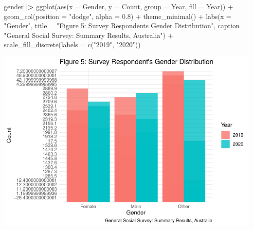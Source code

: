 \documentclass[
]{article}
\newenvironment{Shaded}{\begin{snugshade}}{\end{snugshade}}
\newcommand{\AttributeTok}[1]{\textcolor[rgb]{0.77,0.63,0.00}{#1}}
\newcommand{\ErrorTok}[1]{\textcolor[rgb]{0.64,0.00,0.00}{\textbf{#1}}}
\newcommand{\FloatTok}[1]{\textcolor[rgb]{0.00,0.00,0.81}{#1}}
\newcommand{\FunctionTok}[1]{\textcolor[rgb]{0.00,0.00,0.00}{#1}}
\newcommand{\NormalTok}[1]{#1}
\newcommand{\SpecialCharTok}[1]{\textcolor[rgb]{0.00,0.00,0.00}{#1}}
\newcommand{\StringTok}[1]{\textcolor[rgb]{0.31,0.60,0.02}{#1}}
\begin{document}
\begin{Shaded}
\begin{Highlighting}[]
\NormalTok{gender }\SpecialCharTok{|}\ErrorTok{\textgreater{}} 
  \FunctionTok{ggplot}\NormalTok{(}\FunctionTok{aes}\NormalTok{(}\AttributeTok{x =}\NormalTok{ Gender, }\AttributeTok{y =}\NormalTok{ Count, }\AttributeTok{group =}\NormalTok{ Year, }\AttributeTok{fill =}\NormalTok{ Year)) }\SpecialCharTok{+}
  \FunctionTok{geom\_col}\NormalTok{(}\AttributeTok{position =} \StringTok{"dodge"}\NormalTok{, }\AttributeTok{alpha =} \FloatTok{0.8}\NormalTok{) }\SpecialCharTok{+}
  \FunctionTok{theme\_minimal}\NormalTok{() }\SpecialCharTok{+} 
  \FunctionTok{labs}\NormalTok{(}\AttributeTok{x =} \StringTok{"Gender"}\NormalTok{, }\AttributeTok{title =} \StringTok{"Figure 5: Survey Respondent\textquotesingle{}s Gender Distribution"}\NormalTok{, }\AttributeTok{caption =} \StringTok{"General Social Survey: Summary Results, Australia"}\NormalTok{) }\SpecialCharTok{+} \FunctionTok{scale\_fill\_discrete}\NormalTok{(}\AttributeTok{labels =} \FunctionTok{c}\NormalTok{(}\StringTok{"2019"}\NormalTok{, }\StringTok{"2020"}\NormalTok{))}
\end{Highlighting}
\end{Shaded}

\includegraphics{P3_files/figure-latex/unnamed-chunk-8-1.pdf}
\end{document}
